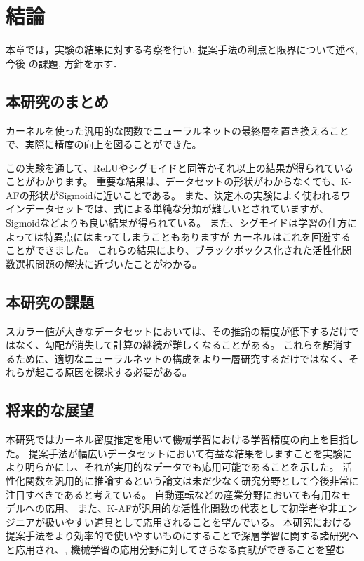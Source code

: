 \chapter{結論}
\label{conclusion}

本章では，実験の結果に対する考察を行い, 提案手法の利点と限界について述べ, 今後
の課題, 方針を示す．


\section{本研究のまとめ}

カーネルを使った汎用的な関数でニューラルネットの最終層を置き換えることで、実際に精度の向上を図ることができた。

 この実験を通して、ReLUやシグモイドと同等かそれ以上の結果が得られていることがわかります。
 重要な結果は、データセットの形状がわからなくても、K-AFの形状がSigmoidに近いことである。 
 また、決定木の実験によく使われるワインデータセットでは、式による単純な分類が難しいとされていますが、Sigmoidなどよりも良い結果が得られている。
 また、シグモイドは学習の仕方によっては特異点にはまってしまうこともありますが カーネルはこれを回避することができました。
 これらの結果により、ブラックボックス化された活性化関数選択問題の解決に近づいたことがわかる。




\section{本研究の課題}
スカラー値が大きなデータセットにおいては、その推論の精度が低下するだけではなく、勾配が消失して計算の継続が難しくなることがある。
これらを解消するために、適切なニューラルネットの構成をより一層研究するだけではなく、それらが起こる原因を探求する必要がある。



\section{将来的な展望}


本研究ではカーネル密度推定を用いて機械学習における学習精度の向上を目指した。
提案手法が幅広いデータセットにおいて有益な結果をしますことを実験により明らかにし、それが実用的なデータでも応用可能であることを示した。
活性化関数を汎用的に推論するという論文は未だ少なく研究分野として今後非常に注目すべきであると考えている。 
自動運転などの産業分野においても有用なモデルへの応用、
また、K-AFが汎用的な活性化関数の代表として初学者や非エンジニアが扱いやすい道具として応用されることを望んでいる。
本研究における提案手法をより効率的で使いやすいものにすることで深層学習に関する諸研究へと応用され、, 機械学習の応用分野に対してさらなる貢献ができることを望む

